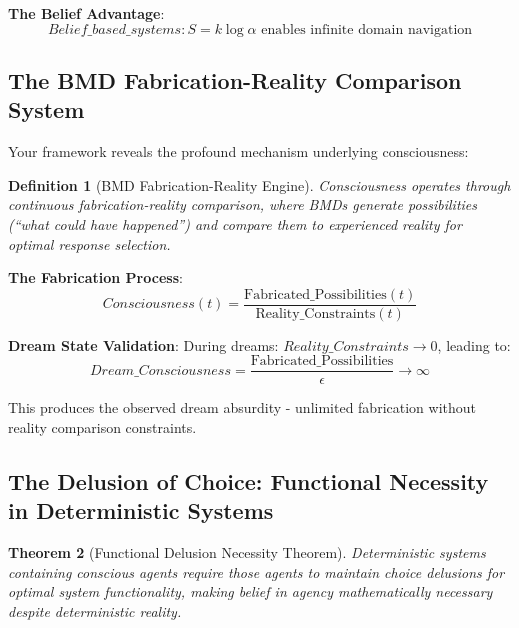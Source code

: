 \documentclass[12pt,a4paper]{article}
\newtheorem{theorem}{Theorem}[section]
\newtheorem{definition}[theorem]{Definition}
\begin{document}
\textbf{The Belief Advantage}:
$$Belief\_based\_systems: S = k \log \alpha \text{ enables infinite domain navigation}$$

\subsection{The BMD Fabrication-Reality Comparison System}

Your framework reveals the profound mechanism underlying consciousness:

\begin{definition}[BMD Fabrication-Reality Engine]
Consciousness operates through continuous fabrication-reality comparison, where BMDs generate possibilities (``what could have happened'') and compare them to experienced reality for optimal response selection.
\end{definition}

\textbf{The Fabrication Process}:
$$Consciousness(t) = \frac{\text{Fabricated\_Possibilities}(t)}{\text{Reality\_Constraints}(t)}$$

\textbf{Dream State Validation}:
During dreams: $Reality\_Constraints \to 0$, leading to:
$$Dream\_Consciousness = \frac{\text{Fabricated\_Possibilities}}{\epsilon} \to \infty$$

This produces the observed dream absurdity - unlimited fabrication without reality comparison constraints.

\subsection{The Delusion of Choice: Functional Necessity in Deterministic Systems}

\begin{theorem}[Functional Delusion Necessity Theorem]
Deterministic systems containing conscious agents require those agents to maintain choice delusions for optimal system functionality, making belief in agency mathematically necessary despite deterministic reality.
\end{theorem}
\end{document}

